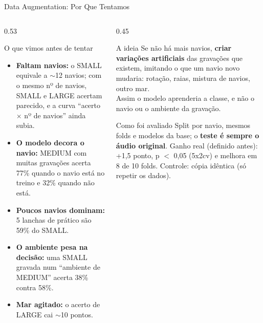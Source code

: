 \documentclass[aspectratio=169]{beamer}
\begin{document}
\begin{frame}{Data Augmentation: Por Que Tentamos}
    \footnotesize
    \begin{columns}[T]
        \begin{column}{0.53\textwidth}
            \begin{block}{\small O que vimos antes de tentar}
                \scriptsize
                \begin{itemize}
                    \setlength{\itemsep}{2pt}
                    \item \textbf{Faltam navios:} o SMALL equivale a $\sim$12 navios; com o mesmo nº de navios, SMALL e LARGE acertam parecido, e a curva ``acerto $\times$ nº de navios'' ainda subia.
                    \item \textbf{O modelo decora o navio:} MEDIUM com muitas gravações acerta 77\% quando o navio está no treino e 32\% quando não está.
                    \item \textbf{Poucos navios dominam:} 5 lanchas de prático são 59\% do SMALL.
                    \item \textbf{O ambiente pesa na decisão:} uma SMALL gravada num ``ambiente de MEDIUM'' acerta 38\% contra 58\%.
                    \item \textbf{Mar agitado:} o acerto de LARGE cai $\sim$10 pontos.
                \end{itemize}
            \end{block}
        \end{column}
        \begin{column}{0.45\textwidth}
            \begin{block}{\small A ideia}
                \scriptsize
                Se não há mais navios, \textbf{criar variações artificiais} das gravações que existem, imitando o que um navio novo mudaria: rotação, raias, mistura de navios, outro mar.\\[3pt]
                Assim o modelo aprenderia a classe, e não o navio ou o ambiente da gravação.
            \end{block}
            \begin{alertblock}{\small Como foi avaliado}
                \scriptsize
                Split por navio, mesmos folds e modelos da base; o \textbf{teste é sempre o áudio original}. Ganho real (definido antes): +1,5 ponto, p $<$ 0,05 (5x2cv) e melhora em 8 de 10 folds. Controle: cópia idêntica (só repetir os dados).
            \end{alertblock}
        \end{column}
    \end{columns}
\end{frame}
\end{document}
